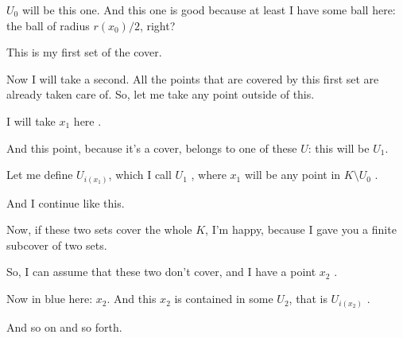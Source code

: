 \begin{proofWrapper}
\begin{speech}[01:14:45 - 01:16:31]
$U_0$ will be this one. And this one is good because at least I have some ball here: the ball of radius $r(x_0) / 2$, right?

This is my first set of the cover.
\end{speech}

\begin{speech}[01:16:31 - 01:18:11]
Now I will take a second. All the points that are covered by this first set are already taken care of. So, let me take any point outside of this.

I will take $x_1$ here .

And this point, because it's a cover, belongs to one of these $U$: this will be $U_1$.

Let me define $U_{i(x_1)}$, which I call $U_1$ , where $x_1$ will be any point in $K \setminus U_0$ .

And I continue like this.

Now, if these two sets cover the whole $K$, I'm happy, because I gave you a finite subcover of two sets.

So, I can assume that these two don't cover, and I have a point $x_2$ .

Now in blue here: $x_2$. And this $x_2$ is contained in some $U_2$, that is $U_{i(x_2)}$ .

And so on and so forth.
\end{speech}


\end{proofWrapper}
